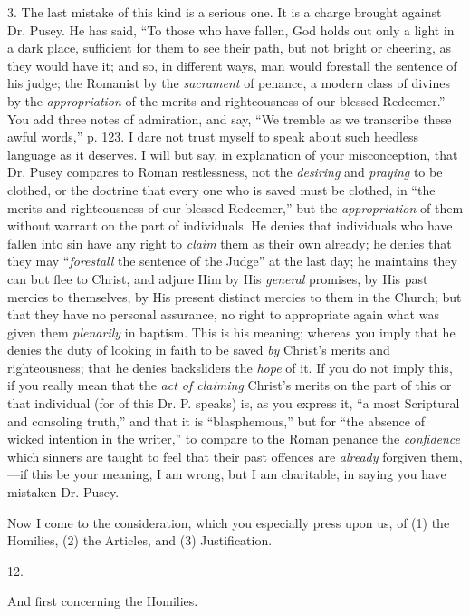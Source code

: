 3. The last mistake of this kind is a serious
one. It is a charge brought against Dr. Pusey. He has said, ``To those
who have fallen, God holds out only a light in a dark place,
sufficient for them to see their path, but not bright or cheering, as
they would have it; and so, in different ways, man would forestall the
sentence of his judge; the Romanist by the \emph{sacrament} of penance, a
modern class of divines by the \emph{appropriation} of the merits and
righteousness of our blessed Redeemer.'' You add three notes of
admiration, and say, ``We tremble as we transcribe these awful words,''
p. 123. I dare not trust myself to speak about such heedless language
as it deserves. I will but say, in explanation of your misconception,
that Dr. Pusey compares to Roman restlessness, not the \emph{desiring} and
\emph{praying} to be clothed, or the doctrine that every one who is
saved must be clothed, in ``the merits and righteousness of our blessed
Redeemer,'' but the \emph{appropriation} of them without warrant on the
part of individuals. He denies that individuals who have fallen into
sin have any right to \emph{claim} them as their own already; he
denies that they may ``\emph{forestall} the sentence of the Judge'' at
the last day; he maintains they can but flee to Christ, and adjure Him
by His \emph{general} promises, by His past mercies to themselves, by
His present distinct mercies to them in the Church; but that they have
no personal assurance, no right to appropriate again what was given
them \emph{plenarily} in baptism. This is his meaning; whereas you
imply that he denies the duty of looking in faith to be saved \emph{by}
Christ's merits and righteousness; that he denies backsliders the \emph{hope}
of it. If you do not imply this, if you really mean that the \emph{act of
claiming} Christ's merits on the part of this or that individual
(for of this Dr. P. speaks) is, as you express it, ``a most Scriptural
and consoling truth,'' and that it is ``blasphemous,'' but for ``the
absence of wicked intention in the writer,'' to compare to the Roman
penance the \emph{confidence} which sinners are taught to feel that
their past offences are \emph{already} forgiven them,—if this be
your meaning, I am wrong, but I am charitable, in saying you have
mistaken Dr. Pusey.

Now I come to the consideration, which you
especially press upon us, of (1) the Homilies, (2) the Articles, and
(3) Justification.

12.

And first concerning the Homilies.

